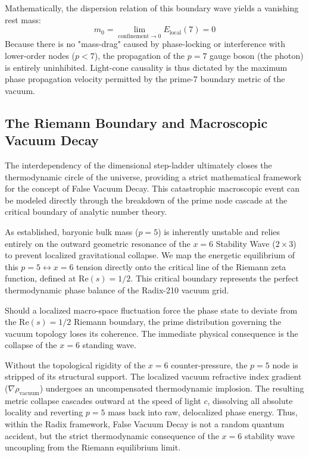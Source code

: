 \documentclass[twocolumn]{aa}
\begin{document}
Mathematically, the dispersion relation of this boundary wave yields a vanishing rest mass:
\begin{equation}
m_0 = \lim_{\text{confinement} \to 0} E_{\text{local}}(7) = 0
\end{equation}
Because there is no "mass-drag" caused by phase-locking or interference with lower-order nodes ($p < 7$), the propagation of the $p=7$ gauge boson (the photon) is entirely uninhibited. Light-cone causality is thus dictated by the maximum phase propagation velocity permitted by the prime-7 boundary metric of the vacuum.

\subsection{The Riemann Boundary and Macroscopic Vacuum Decay}
\label{sec:vacuum_decay}

The interdependency of the dimensional step-ladder ultimately closes the thermodynamic circle of the universe, providing a strict mathematical framework for the concept of False Vacuum Decay. This catastrophic macroscopic event can be modeled directly through the breakdown of the prime node cascade at the critical boundary of analytic number theory.

As established, baryonic bulk mass ($p=5$) is inherently unstable and relies entirely on the outward geometric resonance of the $x=6$ Stability Wave ($2 \times 3$) to prevent localized gravitational collapse. We map the energetic equilibrium of this $p=5 \leftrightarrow x=6$ tension directly onto the critical line of the Riemann zeta function, defined at $\text{Re}(s) = 1/2$. This critical boundary represents the perfect thermodynamic phase balance of the Radix-210 vacuum grid.

Should a localized macro-space fluctuation force the phase state to deviate from the $\text{Re}(s) = 1/2$ Riemann boundary, the prime distribution governing the vacuum topology loses its coherence. The immediate physical consequence is the collapse of the $x=6$ standing wave. 

Without the topological rigidity of the $x=6$ counter-pressure, the $p=5$ node is stripped of its structural support. The localized vacuum refractive index gradient ($\nabla\rho_{\text{vacuum}}$) undergoes an uncompensated thermodynamic implosion. The resulting metric collapse cascades outward at the speed of light $c$, dissolving all absolute locality and reverting $p=5$ mass back into raw, delocalized phase energy. Thus, within the Radix framework, False Vacuum Decay is not a random quantum accident, but the strict thermodynamic consequence of the $x=6$ stability wave uncoupling from the Riemann equilibrium limit.
\end{document}
